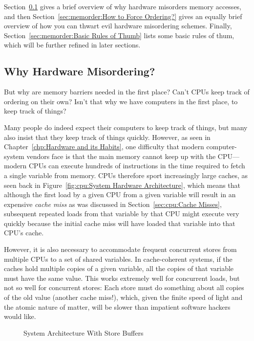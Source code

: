 Section~\ref{sec:memorder:Why Hardware Misordering?}
gives a brief overview of why hardware misorders memory accesses, and then
Section~\ref{sec:memorder:How to Force Ordering?}
gives an equally brief overview of how you can thwart evil hardware
misordering schemes.
Finally, Section~\ref{sec:memorder:Basic Rules of Thumb}
lists some basic rules of thum, which will be further refined in
later sections.

\subsection{Why Hardware Misordering?}
\label{sec:memorder:Why Hardware Misordering?}

But why are memory barriers needed in the first place?
Can't CPUs keep track of ordering on their own?
Isn't that why we have computers in the first place, to keep track of things?

Many people do indeed expect their computers to keep track of things,
but many also insist that they keep track of things quickly.
However, as seen in Chapter~\ref{chp:Hardware and its Habits},
one difficulty that modern computer-system vendors face is that
the main memory cannot keep up with the CPU---modern CPUs can execute
hundreds of instructions in the time required to fetch a single variable
from memory.
CPUs therefore sport increasingly large caches, as seen back in
Figure~\ref{fig:cpu:System Hardware Architecture}, which means that
although the first load by a given CPU from a given variable will
result in an expensive \emph{cache miss} as was discussed in
Section~\ref{sec:cpu:Cache Misses}, subsequent
repeated loads from that variable by that CPU might execute
very quickly because the initial cache miss will have loaded that
variable into that CPU's cache.

However, it is also necessary to accommodate frequent concurrent stores
from multiple CPUs to a set of shared variables.
In cache-coherent systems, if the caches hold multiple copies of a given
variable, all the copies of that variable must have the same value.
This works extremely well for concurrent loads, but not so well for
concurrent stores:  Each store must do something about all
copies of the old value (another cache miss!), which, given the finite
speed of light and the atomic nature of matter, will be slower
than impatient software hackers would like.

\begin{figure}[tb]
\centering
{}
\caption{System Architecture With Store Buffers}
\label{fig:memorder:System Architecture With Store Buffers}
\end{figure}

